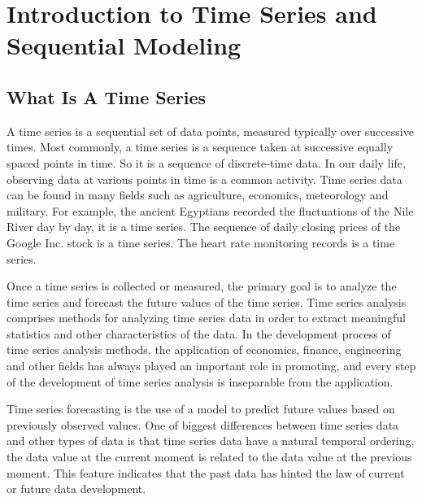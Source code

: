
\chapter{Introduction to Time Series and Sequential Modeling} %

\label{Chapter1} %


\newcommand{\keyword}[1]{\textbf{#1}}
\newcommand{\tabhead}[1]{\textbf{#1}}
\newcommand{\code}[1]{\texttt{#1}}
\newcommand{\file}[1]{\texttt{\bfseries#1}}
\newcommand{\option}[1]{\texttt{\itshape#1}}


\section{What Is A Time Series}

A time series is a sequential set of data points, measured typically over successive times. Most commonly, a time series is a sequence taken at successive equally spaced points in time. So it is a sequence of discrete-time data. In our daily life, observing data at various points in time is a common activity. Time series data can be found in many fields such as agriculture, economics, meteorology and military. For example, the ancient Egyptians recorded the fluctuations of the Nile River day by day, it is a time series. The sequence of daily closing prices of the Google Inc. stock is a time series. The heart rate monitoring records is a time series.

Once a time series is collected or measured, the primary goal is to analyze the time series and forecast the future values of the time series. Time series analysis comprises methods for analyzing time series data in order to extract meaningful statistics and other characteristics of the data. In the development process of time series analysis methods, the application of economics, finance, engineering and other fields has always played an important role in promoting, and every step of the development of time series analysis is inseparable from the application. 

Time series forecasting is the use of a model to predict future values based on previously observed values. One of biggest differences between time series data and other types of data is that time series data have a natural temporal ordering, the data value at the current moment is related to the data value at the previous moment. This feature indicates that the past data has hinted the law of current or future data development.

